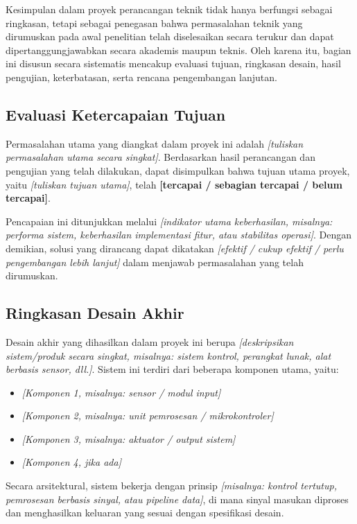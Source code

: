 Kesimpulan dalam proyek perancangan teknik tidak hanya berfungsi sebagai ringkasan, tetapi sebagai penegasan bahwa permasalahan teknik yang dirumuskan pada awal penelitian telah diselesaikan secara terukur dan dapat dipertanggungjawabkan secara akademis maupun teknis. Oleh karena itu, bagian ini disusun secara sistematis mencakup evaluasi tujuan, ringkasan desain, hasil pengujian, keterbatasan, serta rencana pengembangan lanjutan.

\subsection{Evaluasi Ketercapaian Tujuan}
\label{subsec:evaluasi_tujuan}

Permasalahan utama yang diangkat dalam proyek ini adalah \textit{[tuliskan permasalahan utama secara singkat]}. Berdasarkan hasil perancangan dan pengujian yang telah dilakukan, dapat disimpulkan bahwa tujuan utama proyek, yaitu \textit{[tuliskan tujuan utama]}, telah \textbf{[tercapai / sebagian tercapai / belum tercapai]}.

Pencapaian ini ditunjukkan melalui \textit{[indikator utama keberhasilan, misalnya: performa sistem, keberhasilan implementasi fitur, atau stabilitas operasi]}. Dengan demikian, solusi yang dirancang dapat dikatakan \textit{[efektif / cukup efektif / perlu pengembangan lebih lanjut]} dalam menjawab permasalahan yang telah dirumuskan.

\subsection{Ringkasan Desain Akhir}
\label{subsec:ringkasan_desain}

Desain akhir yang dihasilkan dalam proyek ini berupa \textit{[deskripsikan sistem/produk secara singkat, misalnya: sistem kontrol, perangkat lunak, alat berbasis sensor, dll.]}. Sistem ini terdiri dari beberapa komponen utama, yaitu:
\begin{itemize}
    \item \textit{[Komponen 1, misalnya: sensor / modul input]}
    \item \textit{[Komponen 2, misalnya: unit pemrosesan / mikrokontroler]}
    \item \textit{[Komponen 3, misalnya: aktuator / output sistem]}
    \item \textit{[Komponen 4, jika ada]}
\end{itemize}

Secara arsitektural, sistem bekerja dengan prinsip \textit{[misalnya: kontrol tertutup, pemrosesan berbasis sinyal, atau pipeline data]}, di mana sinyal masukan diproses dan menghasilkan keluaran yang sesuai dengan spesifikasi desain.


